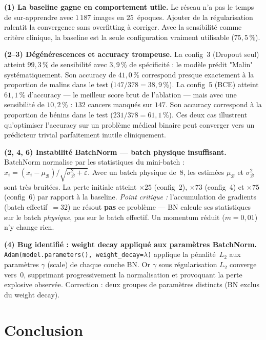 \documentclass[10pt, a4paper]{article}
\begin{document}
\textbf{(1) La baseline gagne en comportement utile.}
Le réseau n'a pas le temps de sur-apprendre avec $1\,187$ images en $25$~époques.
Ajouter de la régularisation ralentit la convergence sans overfitting à corriger.
Avec la sensibilité comme critère clinique, la baseline est la seule configuration vraiment
utilisable ($75{,}5\,\%$).

\textbf{(2–3) Dégénérescences et accuracy trompeuse.}
La config~3 (Dropout seul) atteint $99{,}3\,\%$ de sensibilité avec $3{,}9\,\%$ de
spécificité : le modèle prédit "Malin" systématiquement.
Son accuracy de $41{,}0\,\%$ correspond presque exactement à la proportion de malins
dans le test ($147/378 = 38{,}9\,\%$).
La config~5 (BCE) atteint $61{,}1\,\%$ d'accuracy — le meilleur score brut de l'ablation
— mais avec une sensibilité de $10{,}2\,\%$ : $132$ cancers manqués sur $147$.
Son accuracy correspond à la proportion de bénins dans le test ($231/378 = 61{,}1\,\%$).
Ces deux cas illustrent qu'optimiser l'accuracy sur un problème médical binaire
peut converger vers un prédicteur trivial parfaitement inutile cliniquement.

\textbf{(2, 4, 6) Instabilité BatchNorm — batch physique insuffisant.}
BatchNorm normalise par les statistiques du mini-batch :
$\hat{x}_i = (x_i - \mu_\mathcal{B})/\sqrt{\sigma_\mathcal{B}^2+\varepsilon}$.
Avec un batch physique de~$8$, les estimées $\mu_\mathcal{B}$ et $\sigma_\mathcal{B}^2$
sont très bruitées. La perte initiale atteint $\times 25$ (config~2), $\times 73$ (config~4)
et $\times 75$ (config~6) par rapport à la baseline.
\emph{Point critique :} l'accumulation de gradients (batch effectif~$=32$) ne résout
\textbf{pas} ce problème — BN calcule ses statistiques sur le batch \emph{physique},
pas sur le batch effectif. Un momentum réduit ($m=0{,}01$) n'y change rien.

\textbf{(4) Bug identifié : weight decay appliqué aux paramètres BatchNorm.}
\texttt{Adam(model.parameters(), weight\_decay=$\lambda$)} applique la pénalité~$L_2$
aux paramètres $\gamma$ (scale) de chaque couche BN.
Or $\gamma$ sous régularisation $L_2$ converge vers~$0$,
supprimant progressivement la normalisation et provoquant la perte explosive observée.
Correction : deux groupes de paramètres distincts (BN exclus du weight decay).

\section{Conclusion}
\end{document}
